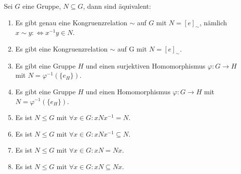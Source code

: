 \begin{theorem}\label{theorem:normalteiler_equiv}
    Sei $G$ eine Gruppe, $N \subseteq G$, dann sind äquivalent:
    \begin{enumerate}[label=(\enumArabicDual*)]
        \item\label{item:theorem:normalteiler_equiv_1} Es gibt genau eine Kongruenzrelation $\sim$ auf $G$ mit $N = [e]_\sim$, nämlich $x \sim y: \Leftrightarrow x^{-1}y \in N$.
        \item\label{item:theorem:normalteiler_equiv_1'} Es gibt eine Kongruenzrelation $\sim$ auf G mit $N = [e]_\sim$.
        \item\label{item:theorem:normalteiler_equiv_2} Es gibt eine Gruppe $H$ und einen surjektiven Homomorphismus $\varphi: G \to H$ mit $N = \varphi^{-1}(\{e_H\})$.
        \item\label{item:theorem:normalteiler_equiv_2'} Es gibt eine Gruppe $H$ und einen Homomorphismus $\varphi: G \to H$ mit $N = \varphi^{-1}(\{e_H\})$.
        \item\label{item:theorem:normalteiler_equiv_3} Es ist $N \le G$ mit $\forall x \in G: xNx^{-1} = N$.
        \item\label{item:theorem:normalteiler_equiv_3'} Es ist $N \le G$ mit $\forall x \in G: xNx^{-1} \subseteq N$.
        \item\label{item:theorem:normalteiler_equiv_4} Es ist $N \le G$ mit $\forall x \in G: xN = Nx$.
        \item\label{item:theorem:normalteiler_equiv_4'} Es ist $N \le G$ mit $\forall x \in G: xN \subseteq Nx$.
    \end{enumerate}
\end{theorem}


